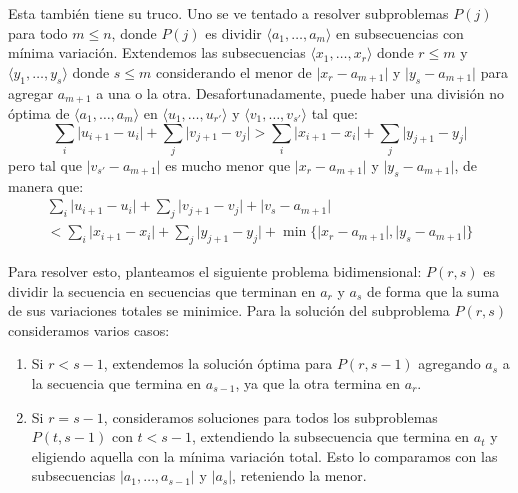   Esta también tiene su truco.
  Uno se ve tentado a resolver subproblemas \(P(j)\) para todo \(m \le n\),
  donde \(P(j)\) es dividir \(\langle a_1, \dotsc, a_m \rangle\)
  en subsecuencias con mínima variación.
  Extendemos las subsecuencias
  \(\langle x_1, \dotsc, x_r \rangle\) donde \(r \le m\)
  y \(\langle y_1, \dotsc, y_s \rangle\) donde \(s \le m\)
  considerando el menor
  de \(\lvert x_r - a_{m + 1} \rvert\) y \(\lvert y_s - a_{m + 1} \rvert\)
  para agregar \(a_{m + 1}\) a una o la otra.
  Desafortunadamente,
  puede haber una división no óptima de \(\langle a_1, \dotsc, a_m \rangle\)
  en \(\langle u_1, \dotsc, u_{r'} \rangle\) y \(\langle v_1, \dotsc, v_{s'} \rangle\)
  tal que:
  \begin{equation*}
    \sum_i \lvert u_{i + 1} - u_i \rvert
        + \sum_j \lvert v_{j + 1} - v_j \rvert
      > \sum_i \lvert x_{i + 1} - x_i \rvert
          + \sum_j \lvert y_{j + 1} - y_j \rvert
  \end{equation*}
  pero tal que \(\lvert v_{s'} - a_{m + 1} \rvert\)
  es mucho menor que \(\lvert x_r - a_{m + 1} \rvert\)
  y \(\lvert y_s - a_{m + 1} \rvert\),
  de manera que:
  \begin{multline*}
    \sum_i \lvert u_{i + 1} - u_i  \rvert
        + \sum_j \lvert v_{j + 1} - v_j	 \rvert
        + \lvert v_s - a_{m + 1} \rvert \\
      < \sum_i \lvert x_{i + 1} - x_i \rvert
          + \sum_j \lvert y_{j + 1} - y_j \rvert
          + \min \{ \lvert x_r - a_{m + 1} \rvert,
                    \lvert y_s - a_{m + 1} \rvert \}
  \end{multline*}

  Para resolver esto,
  planteamos el siguiente problema bidimensional:
  \(P(r, s)\) es dividir la secuencia en secuencias
  que terminan en \(a_r\) y \(a_s\)
  de forma que la suma de sus variaciones totales se minimice.
  Para la solución del subproblema \(P(r, s)\)
  consideramos varios casos:
  \begin{enumerate}
  \item
    Si \(r < s - 1\),
    extendemos la solución óptima para \(P(r, s - 1)\)
    agregando \(a_s\) a la secuencia que termina en \(a_{s - 1}\),
    ya que la otra termina en \(a_r\).
  \item
    Si \(r = s - 1\),
    consideramos soluciones para todos los subproblemas \(P(t, s - 1)\)
    con \(t < s - 1\),
    extendiendo la subsecuencia que termina en \(a_t\)
    y eligiendo aquella con la mínima variación total.
    Esto lo comparamos
    con las subsecuencias \(\lvert a_1, \dotsc, a_{s - 1} \rvert\)
    y \(\lvert a_s \rvert\),
    reteniendo la menor.
  \end{enumerate}

